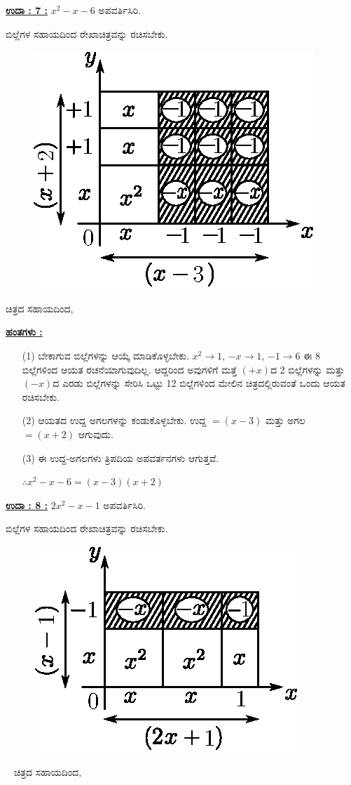 \noindent
{\textbf{\underline{ಉದಾ : 7 :}}} $x^2 - x - 6$ ಅಪವರ್ತಿಸಿರಿ. 

ಬಿಲ್ಲೆಗಳ ಸಹಾಯದಿಂದ ರೇಖಾಚಿತ್ರವನ್ನು ರಚಿಸಬೇಕು.
\begin{figure}[H]
\centering
\includegraphics[scale=0.8]{src/figure/chap3/fig3-45.eps}
\end{figure}
ಚಿತ್ರದ ಸಹಾಯದಿಂದ,

\noindent
{\textbf{\underline{ಹಂತಗಳು :}}}
\begin{itemize}
\item [(1)] ಬೇಕಾಗುವ ಬಿಲ್ಲೆಗಳನ್ನು ಆಯ್ಕೆ ಮಾಡಿಕೊಳ್ಳಬೇಕು. $x^2 \rightarrow 1$, $-x \rightarrow 1$, $-1 \rightarrow 6$ ಈ 8 ಬಿಲ್ಲೆಗಳಿಂದ ಆಯತ ರಚನೆಯಾಗುವುದಿಲ್ಲ. ಆದ್ದರಿಂದ ಅವುಗಳಿಗೆ ಮತ್ತೆ $(+x)$ದ 2 ಬಿಲ್ಲೆಗಳನ್ನು ಮತ್ತು $(-x)$ದ ಎರಡು ಬಿಲ್ಲೆಗಳನ್ನು ಸೇರಿಸಿ ಒಟ್ಟು 12 ಬಿಲ್ಲೆಗಳಿಂದ ಮೇಲಿನ ಚಿತ್ರದಲ್ಲಿರುವಂತೆ ಒಂದು ಆಯತ ರಚಿಸಬೇಕು. 
\item [(2)] ಆಯತದ ಉದ್ದ ಅಗಲಗಳನ್ನು ಕಂಡುಕೊಳ್ಳಬೇಕು. ಉದ್ದ $= (x-3)$ ಮತ್ತು ಅಗಲ $= (x + 2)$ ಆಗುವುದು. 
\item [(3)] ಈ ಉದ್ದ-ಅಗಲಗಳು ತ್ರಿಪದಿಯ ಅಪವರ್ತನಗಳು ಆಗುತ್ತವೆ.

$\therefore x^2 - x - 6 = (x - 3)(x+2)$
\end{itemize}


\noindent
{\textbf{\underline{ಉದಾ : 8 :}}} $2x^2 - x - 1$ ಅಪವರ್ತಿಸಿರಿ. 

ಬಿಲ್ಲೆಗಳ ಸಹಾಯದಿಂದ ರೇಖಾಚಿತ್ರವನ್ನು ರಚಿಸಬೇಕು.
\begin{figure}[H]
\centering
\includegraphics[scale=0.8]{src/figure/chap3/fig3-46.eps}
\end{figure}
~
\vskip -0.5cm
ಚಿತ್ರದ ಸಹಾಯದಿಂದ,


